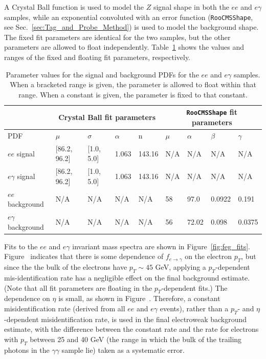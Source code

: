 \documentclass[dissertation.tex]{subfiles}
\begin{document}
A Crystal Ball function is used to model the $Z$ signal shape in both the $ee$ and $e\gamma$ samples, while an exponential convoluted with an error function (\verb+RooCMSShape+, see Sec.~\ref{sec:Tag_and_Probe_Method}) is used to model the background shape.  The fixed fit parameters are identical for the two samples, but the other parameters are allowed to float independently.  Table~\ref{tab:feg_fit_parameters} shows the values and ranges of the fixed and floating fit parameters, respectively.

\begin{table}[hcbp]
\caption{Parameter values for the signal and background PDFs for the $ee$ and $e\gamma$ samples.  When a bracketed range is given, the parameter is allowed to float within that range.  When a constant is given, the parameter is fixed to that constant.}
\centering
\begin{tabular}{|m{1.25cm}|m{1.25cm}|m{1.25cm}|m{1.25cm}|m{1.25cm}|m{1.25cm}|m{1.25cm}|m{1.25cm}|m{1.25cm}|}
\hline
& \multicolumn{4}{c|}{Crystal Ball fit parameters} & \multicolumn{4}{c|}{\texttt{RooCMSShape} fit parameters} \\
\hline
PDF & $\mu$ & $\sigma$ & $\alpha$ & n & $\mu$ & $\alpha$ & $\beta$ & $\gamma$ \\
\hline
$ee$ signal & [86.2, 96.2] & [1.0, 5.0] & 1.063 & 143.16 & N/A & N/A & N/A & N/A \\
\hline
$e\gamma$ signal & [86.2, 96.2] & [1.0, 5.0] & 1.063 & 143.16 & N/A & N/A & N/A & N/A \\
\hline
$ee$ background & N/A & N/A & N/A & N/A & 58 & 97.0 & 0.0922 & 0.191 \\
\hline
$e\gamma$ background & N/A & N/A & N/A & N/A & 56 & 72.02 & 0.098 & 0.0375 \\
\hline
\end{tabular}
\label{tab:feg_fit_parameters}
\end{table}

Fits to the $ee$ and $e\gamma$ invariant mass spectra are shown in Figure~\ref{fig:feg_fits}.  Figure~ indicates that there is some dependence of $f_{e\rightarrow\gamma}$ on the electron $p_{T}$, but since the the bulk of the electrons have $p_{T}\sim45$ GeV, applying a $p_{T}$-dependent mis-identification rate has a negligible effect on the final background estimate.  (Note that all fit parameters are floating in the $p_{T}$-dependent fits.)  The dependence on $\eta$ is small, as shown in Figure~.  Therefore, a constant misidentification rate (derived from all $ee$ and $e\gamma$ events), rather than a $p_{T}$- and $\eta$-dependent misidentification rate, is used in the final electroweak background estimate, with the difference between the constant rate and the rate for electrons with $p_{T}$ between 25 and 40 GeV (the range in which the bulk of the trailing photons in the $\gamma\gamma$ sample lie) taken as a systematic error.
\end{document}
